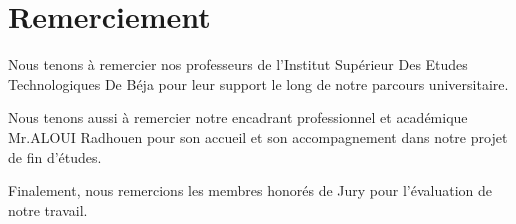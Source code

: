 \chapter*{\centering Remerciement}
Nous tenons à remercier nos professeurs de l'Institut Supérieur Des Etudes Technologiques De Béja pour leur support le long de notre parcours universitaire.

Nous tenons aussi à remercier notre encadrant professionnel et académique Mr.ALOUI Radhouen pour son accueil et son accompagnement dans notre projet de fin d'études.

Finalement, nous remercions les membres honorés de Jury pour l'évaluation de notre travail.
